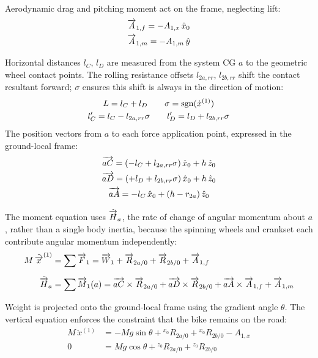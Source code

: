 \begin{aiblock}
Aerodynamic drag and pitching moment act on the frame, neglecting lift:
\begin{gather}
    \overrightarrow{A}_{1,f} = -A_{1,x}\,\hat{x}_0 \\
    \overrightarrow{A}_{1,m} = -A_{1,m}\,\hat{y}
\end{gather}

Horizontal distances $l_C$, $l_D$ are measured from the system CG $a$ to the geometric wheel contact points. The rolling resistance offsets $l_{2a,rr}$, $l_{2b,rr}$ shift the contact resultant forward; $\sigma$ ensures this shift is always in the direction of motion:
\begin{gather}
    L = l_C + l_D \qquad \sigma = \operatorname{sgn}(\dot{x}^{(1)}) \\
    l_C' = l_C - l_{2a,rr}\sigma \qquad l_D' = l_D + l_{2b,rr}\sigma
\end{gather}
The position vectors from $a$ to each force application point, expressed in the ground-local frame:
\begin{gather}
    \overrightarrow{aC} = (-l_C + l_{2a,rr}\sigma)\,\hat{x}_0 + h\,\hat{z}_0 \\
    \overrightarrow{aD} = (+l_D + l_{2b,rr}\sigma)\,\hat{x}_0 + h\,\hat{z}_0 \\
    \overrightarrow{aA} = -l_C\,\hat{x}_0 + (h - r_{2a})\,\hat{z}_0
\end{gather}

The moment equation uses $\dot{\overrightarrow{H}}_a$, the rate of change of angular momentum about $a$, rather than a single body inertia, because the spinning wheels and crankset each contribute angular momentum independently:
\begin{align}
    M\,\ddot{\overrightarrow{x}}^{(1)} &= \sum \overrightarrow{F}_1 = \overrightarrow{W}_1 + \overrightarrow{R}_{2a/0} + \overrightarrow{R}_{2b/0} + \overrightarrow{A}_{1,f} \\[6pt]
    \dot{\overrightarrow{H}}_a &= \sum \overrightarrow{M}_1(a) = \overrightarrow{aC}\times\overrightarrow{R}_{2a/0} + \overrightarrow{aD}\times\overrightarrow{R}_{2b/0} + \overrightarrow{aA}\times\overrightarrow{A}_{1,f} + \overrightarrow{A}_{1,m}
\end{align}

Weight is projected onto the ground-local frame using the gradient angle $\theta$. The vertical equation enforces the constraint that the bike remains on the road:
\begin{align}
    M\,\ddot{x}^{(1)} &= -Mg\sin\theta + {}^{x_0}R_{2a/0} + {}^{x_0}R_{2b/0} - A_{1,x} \\
    0                 &= Mg\cos\theta + {}^{z_0}R_{2a/0} + {}^{z_0}R_{2b/0}
\end{align}


\end{aiblock}
